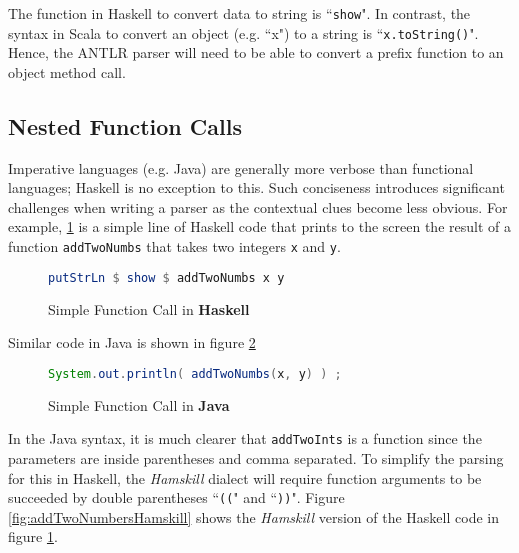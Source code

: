 \documentclass{report}
\begin{document}
The function in Haskell to convert data to string is ``{\tt show}". In contrast, the syntax in Scala to convert an object (e.g. ``x") to a string is ``{\tt x.toString()}".  Hence, the ANTLR parser will need to be able to convert a prefix function to an object method call.

\subsection{Nested Function Calls}

Imperative languages (e.g. Java) are generally more verbose than functional languages; Haskell is no exception to this.  Such conciseness introduces significant challenges when writing a parser as the contextual clues become less obvious.  For example, \ref{fig:addTwoNumbersHaskell} is a simple line of Haskell code that prints to the screen the result of a function {\tt addTwoNumbs} that takes two integers {\tt x} and {\tt y}. 

\begin{figure}[H]\label{fig:addTwoNumbersHaskell}
\begin{mdframed}
\begin{lstlisting}[language=Haskell]
putStrLn $ show $ addTwoNumbs x y
\end{lstlisting}
\end{mdframed}
\caption{Simple Function Call in \textbf{Haskell}}
\end{figure}

Similar code in Java is shown in figure \ref{fig:addTwoNumbersJava}

\begin{figure}[H]\label{fig:addTwoNumbersJava}
\begin{mdframed}
\begin{lstlisting}[language=Java]
System.out.println( addTwoNumbs(x, y) ) ;
\end{lstlisting}
\end{mdframed}
\caption{Simple Function Call in \textbf{Java}}
\end{figure}

In the Java syntax, it is much clearer that {\tt addTwoInts} is a function since the parameters are inside parentheses and comma separated.  To simplify the parsing for this in Haskell, the \emph{Hamskill} dialect will require function arguments to be succeeded by double parentheses ``{\tt ((}" and ``{\tt ))}".  Figure \ref{fig:addTwoNumbersHamskill} shows the \emph{Hamskill} version of the Haskell code in figure \ref{fig:addTwoNumbersHaskell}.
\end{document}
